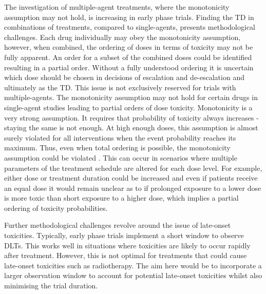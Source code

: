 The investigation of multiple-agent treatments, where the monotonicity assumption may not hold, is increasing in early phase trials. Finding the TD in combinations of treatments, compared to single-agents,  presents methodological challenges. Each drug individually may obey the monotonicity assumption, however, when combined, the ordering of doses in terms of toxicity may not be fully apparent. An order for a subset of the combined doses could be identified resulting in a partial order. Without a fully understood ordering it is uncertain which dose should be chosen in decisions of escalation and de-escalation and ultimately as the TD. This issue is not exclusively reserved for trials with multiple-agents. The monotonicity assumption may not hold for certain drugs in single-agent studies leading to partial orders of dose toxicity. Monotonicity is a very strong assumption. It requires that probability of toxicity always increases - staying the same is not enough. At high enough doses, this assumption is almost surely violated for all interventions when the event probability reaches its maximum. Thus, even when total ordering is possible, the monotonicity assumption could be violated \cite{brockMoreBetterAnalysis2020}. This can occur in scenarios where multiple parameters of the treatment schedule are altered for each dose level. For example, either dose or treatment duration could be increased and even if patients receive an equal dose it would remain unclear as to if prolonged exposure to a lower dose is more toxic than short exposure to a higher dose, which implies a partial ordering of toxicity probabilities. 

Further methodological challenges revolve around the issue of late-onset toxicities. Typically, early phase trials implement a short window to observe DLTs. This works well in situations where toxicities are likely to occur rapidly after treatment. However, this is not optimal for treatments that could cause late-onset toxicities such as radiotherapy. The aim here would be to incorporate a larger observation window to account for potential late-onset toxicities whilst also minimising the trial duration. 

